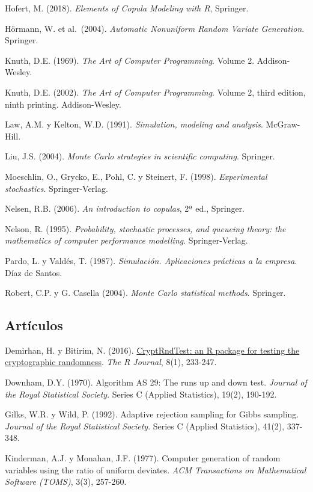 \documentclass[
]{book}
\theoremstyle{break}
\theoremstyle{definition}
\theoremstyle{definition}
\theoremstyle{definition}
\theoremstyle{definition}
\theoremstyle{remark}
\begin{document}
Hofert, M. (2018). \emph{Elements of Copula Modeling with R}, Springer.

Hörmann, W. et al.~(2004). \emph{Automatic Nonuniform Random Variate Generation}. Springer.

Knuth, D.E. (1969). \emph{The Art of Computer Programming}. Volume 2. Addison-Wesley.

Knuth, D.E. (2002). \emph{The Art of Computer Programming}. Volume 2, third edition, ninth printing. Addison-Wesley.

Law, A.M. y Kelton, W.D. (1991). \emph{Simulation, modeling and analysis}. McGraw-Hill.

Liu, J.S. (2004). \emph{Monte Carlo strategies in scientific computing}. Springer.

Moeschlin, O., Grycko, E., Pohl, C. y Steinert, F. (1998). \emph{Experimental stochastics}. Springer-Verlag.

Nelsen, R.B. (2006). \emph{An introduction to copulas}, 2ª ed., Springer.

Nelson, R. (1995). \emph{Probability, stochastic processes, and queueing theory: the mathematics of computer performance modelling}. Springer-Verlag.

Pardo, L. y Valdés, T. (1987). \emph{Simulación. Aplicaciones prácticas a la empresa}. Díaz de Santos.

Robert, C.P. y G. Casella (2004). \emph{Monte Carlo statistical methods}. Springer.

\hypertarget{artuxedculos}{%
\subsection*{Artículos}\label{artuxedculos}}

Demirhan, H. y Bitirim, N. (2016). \href{https://journal.r-project.org/archive/2016/RJ-2016-016/index.html}{CryptRndTest: an R package for testing the cryptographic randomness}. \emph{The R Journal}, 8(1), 233-247.

Downham, D.Y. (1970). Algorithm AS 29: The runs up and down test. \emph{Journal of the Royal Statistical Society}. Series C (Applied Statistics), 19(2), 190-192.

Gilks, W.R. y Wild, P. (1992). Adaptive rejection sampling for Gibbs sampling. \emph{Journal of the Royal Statistical Society}. Series C (Applied Statistics), 41(2), 337-348.

Kinderman, A.J. y Monahan, J.F. (1977). Computer generation of random variables using the ratio of uniform deviates. \emph{ACM Transactions on Mathematical Software (TOMS)}, 3(3), 257-260.
\end{document}
